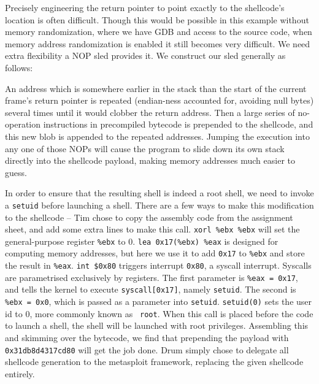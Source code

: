 Precisely engineering the return pointer to point exactly to the shellcode's location is often difficult. Though this
would be possible in this example without memory randomization, where we have GDB and access to the source code, when
memory address randomization is enabled it still becomes very difficult. We need extra flexibility a NOP sled provides
it. We construct our sled generally as follows:

An address which is somewhere earlier in the stack than the start of the current frame's return pointer is repeated
(endian-ness accounted for, avoiding null bytes) several times until it would clobber the return address. Then a large
series of no-operation instructions in precompiled bytecode is prepended to the shellcode, and this new blob is appended
to the repeated addresses. Jumping the execution into any one of those NOPs will cause the program to slide down its own
stack directly into the shellcode payload, making memory addresses much easier to guess.

In order to ensure that the resulting shell is indeed a root shell, we need to invoke a {\tt setuid} before launching a
shell. There are a few ways to make this modification to the shellcode -- Tim chose to copy the assembly code from the
assignment sheet, and add some extra lines to make this call. {\tt xorl \%ebx \%ebx} will set the general-purpose
register {\tt \%ebx} to 0. {\tt lea 0x17(\%ebx) \%eax} is designed for computing memory addresses, but here we use it to
add {\tt 0x17} to {\tt \%ebx} and store the result in {\tt \%eax}. {\tt int \$0x80} triggers interrupt {\tt 0x80}, a
syscall interrupt. Syscalls are parametrised exclusively by registers\cite{syscalls}. The first parameter is {\tt \%eax
= 0x17}, and tells the kernel to execute {\tt syscall[0x17]}, namely {\tt setuid}. The second is {\tt \%ebx = 0x0},
which is passed as a parameter into {\tt setuid}. {\tt setuid(0)} sets the user id to 0, more commonly known as {\tt
root}. When this call is placed before the code to launch a shell, the shell will be launched with root privileges.
Assembling this and skimming over the bytecode, we find that prepending the payload with {\tt 0x31db8d4317cd80} will get
the job done. Drum simply chose to delegate all shellcode generation to the metasploit framework, replacing the given
shellcode entirely.
